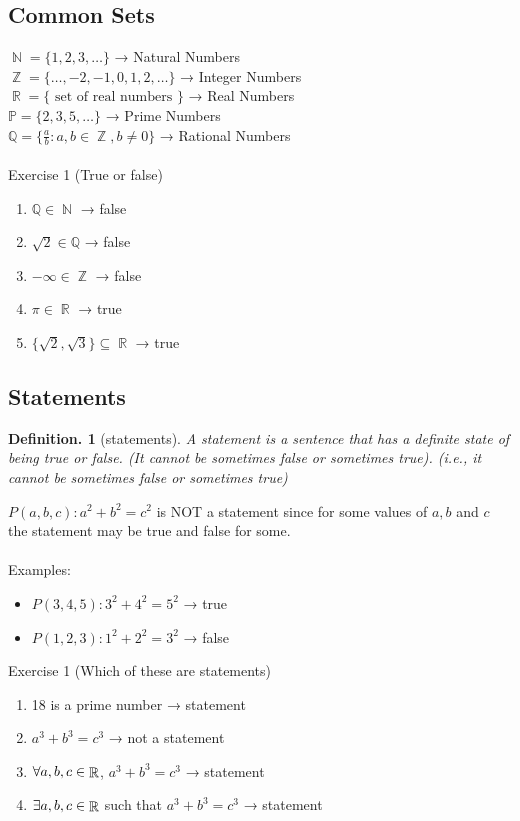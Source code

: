 \documentclass[11pt, a4paper]{memoir}
\DeclareMathOperator{\N}{{\mathbb{N}}}
\DeclareMathOperator{\Z}{{\mathbb{Z}}}
\DeclareMathOperator{\R}{{\mathbb{R}}}
\theoremstyle{change}
\theoremstyle{plain}
\theoremstyle{nonumberplain}
\newtheorem{definition}{Definition.}
\numberwithin{equation}{section}
\begin{document}
\subsection{Common Sets}
$\N = \{1, 2, 3, \dots\}$ → Natural Numbers\\
$\Z = \{\dots, -2, -1, 0, 1, 2, \dots\}$ → Integer Numbers\\
$\R = \{\text{ set of real numbers }\}$ → Real Numbers\\
$\mathbb{P} = \{2, 3, 5, \dots \}$ → Prime Numbers\\
$\mathbb{Q} = \{\frac{a}{b}: a, b \in \Z, b \ne 0\}$ → Rational Numbers\\ \vspace{1ex} \\
Exercise 1 (True or false)
\begin{enumerate}
    \item $\mathbb{Q} \in \N$ → false
    \item $\sqrt{2} \in \mathbb{Q}$ → false
    \item $- \infty \in \Z$ → false
    \item $\pi \in \R$ → true
    \item $\{\sqrt{2}, \sqrt{3}\} \subseteq \R$  → true
\end{enumerate}
\subsection{Statements}
\begin{definition}[statements]
  A statement is a sentence that has a definite state of being true or false. (It cannot be sometimes false or sometimes true). (i.e., it cannot be sometimes false or sometimes true)  
\end{definition}
$P(a, b, c): a^2 + b^2 = c^2$ is NOT a statement since for some values of $a, b $ and $c $ the statement may be true and false for some. \\ \vspace{1ex}\\
Examples: 
\begin{itemize}
    \item $P(3, 4, 5): 3^2 + 4^2 = 5^2$  → true
    \item $P(1, 2, 3): 1^2 + 2^2 = 3^2$  → false
\end{itemize} 
Exercise 1 (Which of these are statements)
\begin{enumerate}
    \item 18 is a prime number → statement
    \item $a^3 + b^3 = c^3$  → not a statement
    \item $\forall \space a, b, c \in \R$,  $a^3 + b^3 = c^3$  → statement
    \item $\exists \space a, b , c \in \R$ such that $a^3 + b^3 = c^3$ → statement
\end{enumerate}
\end{document}
